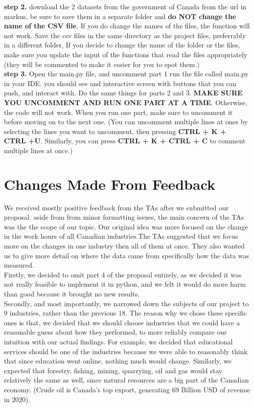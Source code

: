 \documentclass[fontsize=11pt]{article}
\begin{document}
\textbf{step 2.}
download the 2 datasets from the government of Canada from the url in markus, be sure to save them in a separate folder and \textbf{do NOT change the name of the CSV file}. If you do change the names of the files, the function will not work. Save the csv files in the same directory as the project files, preferrably in a different folder, If you decide to change the name of the folder or the files, make sure you update the input of the functions that read the files appropriately (they will be commented to make it easier for you to spot them.)  \\
 
\textbf{step 3.} Open the main.py file, and uncomment part 1
run the file called main.py in your IDE.
you should see and interactive screen with buttons that you can push, and interact with. 
Do the same things for parts 2 and 3. \textbf{MAKE SURE YOU UNCOMMENT AND RUN ONE PART AT A TIME}. Otherwise, the code will not work. When you run one part, make sure to uncomment it before moving on to the next one. (You can uncomment multiple lines at ones by selecting the lines you want to uncomment, then pressing \textbf{CTRL + K + CTRL +U}. Similarly, you can press \textbf{CTRL + K + CTRL + C} to comment multiple lines at once.)
 
\section*{Changes Made From Feedback}  

We received mostly positive feedback from the TAs after we submitted our proposal. aside from from minor formatting issues, the main concern of the TAs was the the scope of our topic. Our original idea was more focused on the change in the work hours of all Canadian industries.The TAs suggested that we focus more on the changes in one industry then all of them at once. They also wanted us to give more detail on where the data came from specifically how the data was measured. \\

Firstly, we decided to omit part 4 of the proposal entirely, as we decided it was not really feasible to implement it in python, and we felt it would do more harm than good because it brought no new results. \\
 
Secondly, and most importantly, we narrowed down the subjects of our project to 9 industries, rather than the previous 18.  The  reason why we chose these specific ones is that, we decided that we should choose industries that we could have a reasonable guess about how they performed, to more reliably compare our intuition with our actual findings. For example, we decided that educational services should be one of the industries because we were able to reasonably think that since education went online, nothing much would change. Similarly, we expected that forestry, fishing, mining, quarrying, oil and gas would stay relatively the same as well, since natural resources are a big part of the Canadian economy. (Crude oil is Canada's top export, generating 69 Billion USD of revenue in 2020).\\
\end{document}
